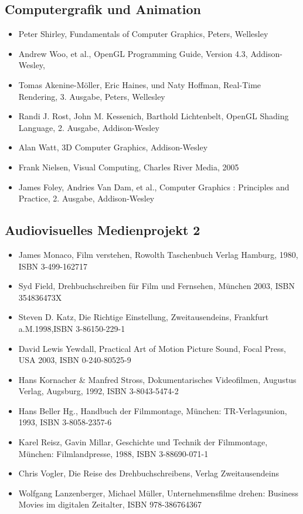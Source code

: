 \subsection{Computergrafik und
Animation}\label{computergrafik-und-animation-3}

\begin{itemize}
\tightlist
\item
  Peter Shirley, Fundamentals of Computer Graphics, Peters, Wellesley
\item
  Andrew Woo, et al., OpenGL Programming Guide, Version 4.3,
  Addison-Wesley,
\item
  Tomas Akenine-Möller, Eric Haines, und Naty Hoffman, Real-Time
  Rendering, 3. Ausgabe, Peters, Wellesley
\item
  Randi J. Rost, John M. Kessenich, Barthold Lichtenbelt, OpenGL Shading
  Language, 2. Ausgabe, Addison-Wesley
\item
  Alan Watt, 3D Computer Graphics, Addison-Wesley
\item
  Frank Nielsen, Visual Computing, Charles River Media, 2005
\item
  James Foley, Andries Van Dam, et al., Computer Graphics : Principles
  and Practice, 2. Ausgabe, Addison-Wesley
\end{itemize}

\subsection{Audiovisuelles Medienprojekt
2}\label{audiovisuelles-medienprojekt-2-3}

\begin{itemize}
\tightlist
\item
  James Monaco, Film verstehen, Rowolth Taschenbuch Verlag Hamburg,
  1980, ISBN 3-499-162717
\item
  Syd Field, Drehbuchschreiben für Film und Fernsehen, München 2003,
  ISBN 354836473X
\item
  Steven D. Katz, Die Richtige Einstellung, Zweitausendeins, Frankfurt
  a.M.1998,ISBN 3-86150-229-1
\item
  David Lewis Yewdall, Practical Art of Motion Picture Sound, Focal
  Press, USA 2003, ISBN 0-240-80525-9
\item
  Hans Kornacher \& Manfred Stross, Dokumentarisches Videofilmen,
  Augustus Verlag, Augsburg, 1992, ISBN 3-8043-5474-2
\item
  Hans Beller Hg., Handbuch der Filmmontage, München: TR-Verlagsunion,
  1993, ISBN 3-8058-2357-6
\item
  Karel Reisz, Gavin Millar, Geschichte und Technik der Filmmontage,
  München: Filmlandpresse, 1988, ISBN 3-88690-071-1
\item
  Chris Vogler, Die Reise des Drehbuchschreibens, Verlag Zweitausendeins
\item
  Wolfgang Lanzenberger, Michael Müller, Unternehmensfilme drehen:
  Business Movies im digitalen Zeitalter, ISBN 978-386764367
\end{itemize}

